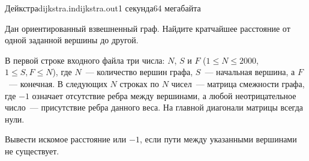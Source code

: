 \begin{problem}{Дейкстра}{dijkstra.in}{dijkstra.out}{1 секунда}{64 мегабайта}

Дан ориентированный взвешненный граф. Найдите кратчайшее расстояние от одной
заданной вершины до другой.

\InputFile

В первой строке входного файла три числа: 
$N$, $S$ и $F$ ($1 \le N \le 2000$, $1 \le S, F \le N$),
где $N$~--- количество вершин графа, $S$~--- начальная вершина, а $F$~--- конечная.
В следующих $N$ строках по $N$ чисел~--- матрица смежности графа,
где $-1$ означает отсутствие ребра между вершинами, а любой неотрицательное
число~--- присутствие ребра данного веса.
На главной диагонали матрицы всегда нули.

\OutputFile

Вывести искомое расстояние или $-1$, если пути между указанными вершинами
не существует.

\Example

\begin{example}
%
\end{example}

\end{problem}

